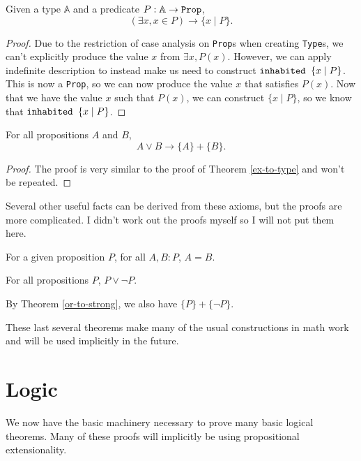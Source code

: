 \documentclass[../math.tex]{subfiles}
\begin{document}
\begin{theorem} \label{ex-to-type}
    Given a type $\mathbb A$ and a predicate $P : \mathbb A \rightarrow
    \verb|Prop|$,
    \[
        (\exists x, x \in P) \rightarrow \{x \mid P\}.
    \]
\end{theorem}
\begin{proof}
    Due to the restriction of case analysis on \verb|Prop|s when creating
    \verb|Type|s, we can't explicitly produce the value $x$ from $\exists x,
    P(x)$.  However, we can apply indefinite description to instead make us
    need to construct $\verb|inhabited | \{x \mid P\}$.  This is now a
    \verb|Prop|, so we can now produce the value $x$ that satisfies $P(x)$.  Now
    that we have the value $x$ such that $P(x)$, we can construct $\{x \mid
    P\}$, so we know that $\verb|inhabited | \{x \mid P\}$.
\end{proof}

\begin{theorem} \label{or-to-strong}
    For all propositions $A$ and $B$,
    \[
        A \vee B \rightarrow \{A\} + \{B\}.
    \]
\end{theorem}
\begin{proof}
    The proof is very similar to the proof of Theorem \ref{ex-to-type} and won't
    be repeated.
\end{proof}

Several other useful facts can be derived from these axioms, but the proofs are
more complicated.  I didn't work out the proofs myself so I will not put them
here.

\begin{theorem}
    For a given proposition $P$, for all $A, B : P$, $A = B$.
\end{theorem}

\begin{theorem}
    For all propositions $P$, $P \vee \neg P$.
\end{theorem}
\noindent By Theorem \ref{or-to-strong}, we also have $\{P\} + \{\neg P\}$.

These last several theorems make many of the usual constructions in math work
and will be used implicitly in the future.

\section{Logic}

We now have the basic machinery necessary to prove many basic logical theorems.
Many of these proofs will implicitly be using propositional extensionality.
\end{document}
